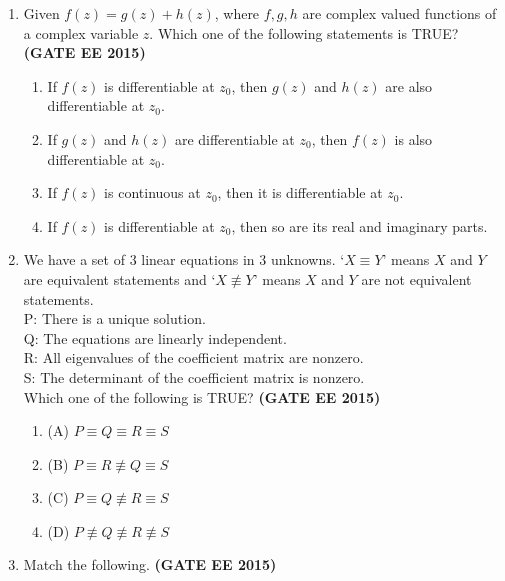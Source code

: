 \documentclass[a4paper,12pt]{exam}
\theoremstyle{remark}
\begin{document}
\begin{enumerate}
\begin{multicols}{4}
\begin{enumerate}
\item (A) 5.34
\item (B) 6.74
\item (C) 28.5
\item (D) 45.49
\end{enumerate}
\end{multicols}
\newpage
{}\\
Number of Questions:55\\
 Section Marks: 85\\
 \vspace{0.5cm
 }


\item Given $f(z) = g(z) + h(z)$, where $f, g, h$ are complex valued functions of a complex variable $z$. Which one of the following statements is TRUE? \hfill{\textbf{(GATE EE 2015)}}


\begin{enumerate}
\item  If $f(z)$ is differentiable at $z_0$, then $g(z)$ and $h(z)$ are also differentiable at $z_0$.
\item  If $g(z)$ and $h(z)$ are differentiable at $z_0$, then $f(z)$ is also differentiable at $z_0$.
\item  If $f(z)$ is continuous at $z_0$, then it is differentiable at $z_0$.
\item  If $f(z)$ is differentiable at $z_0$, then so are its real and imaginary parts.
\end{enumerate}

\item We have a set of $3$ linear equations in $3$ unknowns. 
`$X \equiv Y$' means $X$ and $Y$ are equivalent statements and 
`$X \not\equiv Y$' means $X$ and $Y$ are not equivalent statements. \\
P: There is a unique solution. \\
Q: The equations are linearly independent. \\
R: All eigenvalues of the coefficient matrix are nonzero. \\
S: The determinant of the coefficient matrix is nonzero. \\

Which one of the following is TRUE? \hfill{\textbf{(GATE EE 2015)}}

\begin{multicols}{2}
\begin{enumerate}
\item (A) $P \equiv Q \equiv R \equiv S$
\item (B) $P \equiv R \not\equiv Q \equiv S$
\item (C) $P \equiv Q \not\equiv R \equiv S$
\item (D) $P \not\equiv Q \not\equiv R \not\equiv S$
\end{enumerate}
\end{multicols}
\item Match the following. \hfill{\textbf{(GATE EE 2015)}}


\end{enumerate}
\end{document}
